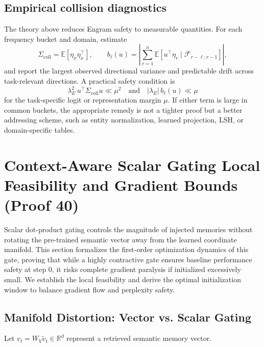 \documentclass[11pt]{article}
\newcommand{\E}{\mathbb{E}}
\begin{document}
\subsection{Empirical collision diagnostics}

The theory above reduces Engram safety to measurable quantities. For each frequency bucket and domain, estimate
\begin{equation}
\Sigma_{\mathrm{coll}} = \E[\eta_x\eta_x^\top],
\qquad
b_\ell(u)=\left|\sum_{r=1}^{n}\E[u^\top\eta_r\mid\mathcal{F}_{r-\ell:r-1}]\right|,
\end{equation}
and report the largest observed directional variance and predictable drift across task-relevant directions. A practical safety condition is
\begin{equation}
\lambda_E^2\,u^\top\Sigma_{\mathrm{coll}}u \ll \mu^2
\quad\text{and}\quad
|\lambda_E|\,b_\ell(u)\ll \mu
\end{equation}
for the task-specific logit or representation margin $\mu$. If either term is large in common buckets, the appropriate remedy is not a tighter proof but a better addressing scheme, such as entity normalization, learned projection, LSH, or domain-specific tables.

\section{Context-Aware Scalar Gating Local Feasibility and Gradient Bounds (Proof 40)}
\label{app:proof40}

Scalar dot-product gating controls the magnitude of injected memories without rotating the pre-trained semantic vector away from the learned coordinate manifold. This section formalizes the first-order optimization dynamics of this gate, proving that while a highly contractive gate ensures baseline performance safety at step 0, it risks complete gradient paralysis if initialized excessively small. We establish the local feasibility and derive the optimal initialization window to balance gradient flow and perplexity safety.

\subsection{Manifold Distortion: Vector vs. Scalar Gating}

Let $v_t = W_V \tilde{v}_t \in \mathbb{R}^d$ represent a retrieved semantic memory vector.
\end{document}
